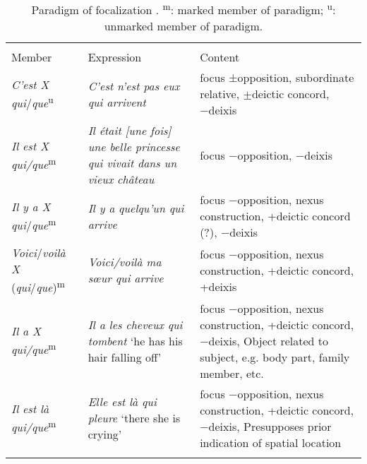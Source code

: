 \documentclass[output=paper]{langsci/langscibook}
\begin{document}
\begin{table}
\small
\caption{Paradigm of focalization \citep{KraghSchosler2019}. \textsuperscript{m}: marked member of paradigm; \textsuperscript{u}: unmarked member of paradigm.}
\label{tab:kragh:3}
\begin{tabularx}{\textwidth}{lQQ}
\lsptoprule
{}\\
{Member} & {Expression} & {Content}\\
\midrule
\textit{C’est X} \textit{qui}/\textit{que}\textsuperscript{u} & \textit{C’est n’est pas eux qui arrivent} & focus ±opposition, subordinate relative, ${\pm}$deictic concord, −deixis\\\tablevspace
\textit{Il est X qui/que}\textsuperscript{m} & \textit{Il était [une fois] une belle princesse qui vivait dans un vieux château} & focus −opposition, −deixis\\\tablevspace
\textit{Il y a X qui}/\textit{que}\textsuperscript{m} & \textit{Il y a quelqu’un qui arrive}  & focus −opposition, nexus construction, +deictic concord (?), −deixis\\\tablevspace
\textit{Voici}\slash\textit{voilà X} (\textit{qui}/\textit{que})\textsuperscript{m} & \textit{Voici/voilà ma sœur qui arrive}  & focus −opposition, nexus construction, +deictic concord, +deixis\\\tablevspace
\textit{Il a X qui/que}\textsuperscript{m} & \textit{Il a les cheveux qui tombent} \newline ‘he has his hair falling off’ & focus −opposition, nexus construction, +deictic concord, −deixis, Object related to subject, e.g. body part, family member, etc.\\\tablevspace
\textit{Il est là qui/que}\textsuperscript{m} & \textit{Elle est là qui pleure} ‘there she is crying’ & focus −opposition, nexus construction, +deictic concord, −deixis, Presupposes prior indication of spatial location\\
\lspbottomrule
\end{tabularx}
\end{table}
\end{document}
